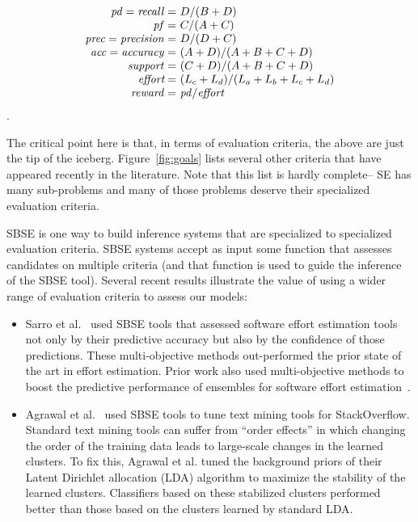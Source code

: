 \documentclass[sigconf]{acmart}
\begin{document}
{\small\[
\begin{array}{r@{~}l}
\mathit{pd}=\mathit{recall}=&D / (B+D)\\
\mathit{pf}=&C / (A+C)\\
\mathit{prec}=\mathit{precision}=&D / (D+C)\\
\mathit{acc}=\mathit{accuracy}=&(A+D) / (A+B+C+D)\\
\mathit{support}=&(C+D) / (A+B+C+D)\\
\textit{effort}=&(L_c+L_d) / (L_a + L_b + L_c + L_d)\\
\mathit{reward}=&\mathit{pd} / \textit{effort}
\end{array}
\]}.






The critical point here is that, in terms of evaluation criteria,  the above are just the tip of the iceberg.
Figure~\ref{fig:goals} lists several other criteria that have appeared recently in the literature. Note that this list is hardly complete-- SE has many sub-problems and many of those
problems deserve their specialized evaluation criteria.

SBSE is one way to build inference systems that are specialized to specialized evaluation
criteria. SBSE systems accept as input some function that assesses candidates on multiple
criteria (and that function is used to guide the inference of the SBSE tool).
Several recent results illustrate the value of using a wider range of evaluation criteria
to assess our models:
\begin{itemize}[leftmargin=*]
\item
Sarro et al.~\cite{sarro2016multi}  used SBSE tools that assessed software effort estimation tools
not only by their predictive accuracy but also by the confidence of those predictions.
These multi-objective methods out-performed the prior state of the art in effort estimation. 
{Prior work also used multi-objective methods to boost the predictive performance of ensembles for
software effort estimation~\cite{minku2013}.}
\item
Agrawal et al.~\cite{agrawalwrong} used SBSE tools to tune text mining tools for StackOverflow.
Standard text mining tools can suffer from ``order effects'' in which changing the order
of the training data leads to large-scale changes in the learned clusters.
To fix this, Agrawal et al. tuned the background priors
of their Latent Dirichlet allocation (LDA) algorithm to maximize the stability
of the learned clusters.  Classifiers based on these stabilized clusters performed better than those based on the clusters learned by standard LDA.
\end{itemize}
\end{document}
